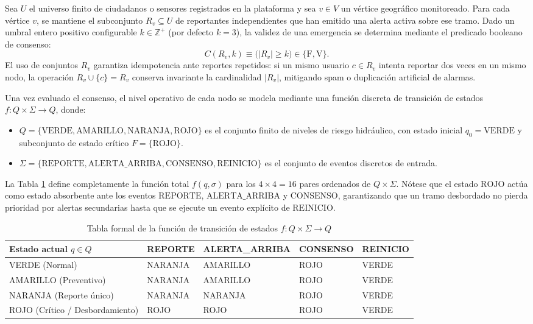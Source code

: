 \documentclass[12pt,letterpaper]{article}
\begin{document}
Sea $U$ el universo finito de ciudadanos o sensores registrados en la plataforma y sea $v \in V$ un vértice geográfico monitoreado. Para cada vértice $v$, se mantiene el subconjunto $R_v \subseteq U$ de reportantes independientes que han emitido una alerta activa sobre ese tramo. Dado un umbral entero positivo configurable $k \in \mathbb{Z}^+$ (por defecto $k = 3$), la validez de una emergencia se determina mediante el predicado booleano de consenso:
\begin{equation}
    C(R_v, k) \equiv \bigl(|R_v| \ge k\bigr) \in \{\text{F}, \text{V}\}.
\end{equation}
El uso de conjuntos $R_v$ garantiza idempotencia ante reportes repetidos: si un mismo usuario $c \in R_v$ intenta reportar dos veces en un mismo nodo, la operación $R_v \cup \{c\} = R_v$ conserva invariante la cardinalidad $|R_v|$, mitigando spam o duplicación artificial de alarmas.

Una vez evaluado el consenso, el nivel operativo de cada nodo se modela mediante una función discreta de transición de estados $f: Q \times \Sigma \to Q$, donde:
\begin{itemize}[leftmargin=2.0cm]
    \item $Q = \{\text{VERDE}, \text{AMARILLO}, \text{NARANJA}, \text{ROJO}\}$ es el conjunto finito de niveles de riesgo hidráulico, con estado inicial $q_0 = \text{VERDE}$ y subconjunto de estado crítico $F = \{\text{ROJO}\}$.
    \item $\Sigma = \{\text{REPORTE}, \text{ALERTA\_ARRIBA}, \text{CONSENSO}, \text{REINICIO}\}$ es el conjunto de eventos discretos de entrada.
\end{itemize}
La Tabla \ref{tab:transicion} define completamente la función total $f(q, \sigma)$ para los $4 \times 4 = 16$ pares ordenados de $Q \times \Sigma$. Nótese que el estado $\text{ROJO}$ actúa como estado absorbente ante los eventos $\text{REPORTE}$, $\text{ALERTA\_ARRIBA}$ y $\text{CONSENSO}$, garantizando que un tramo desbordado no pierda prioridad por alertas secundarias hasta que se ejecute un evento explícito de $\text{REINICIO}$.

\begin{table}[H]
    \centering
    \singlespacing
    \caption{Tabla formal de la función de transición de estados $f: Q \times \Sigma \to Q$}
    \label{tab:transicion}
    \small
    \begin{tabular}{@{}lllll@{}}
        \toprule
        \textbf{Estado actual $q \in Q$} & \textbf{REPORTE} & \textbf{ALERTA\_ARRIBA} & \textbf{CONSENSO} & \textbf{REINICIO} \\
        \midrule
        VERDE (Normal)                  & NARANJA & AMARILLO & ROJO & VERDE \\
        AMARILLO (Preventivo)           & NARANJA & AMARILLO & ROJO & VERDE \\
        NARANJA (Reporte único)         & NARANJA & NARANJA  & ROJO & VERDE \\
        ROJO (Crítico / Desbordamiento) & ROJO    & ROJO     & ROJO & VERDE \\
        \bottomrule
    \end{tabular}
\end{table}
\end{document}
